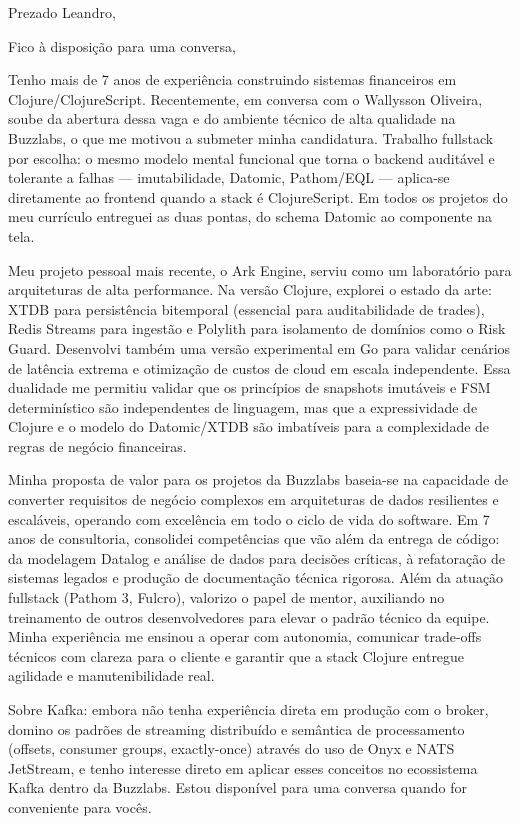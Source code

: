 \documentclass[10pt,a4paper,sans]{moderncv}
\begin{document}
\makecvtitle

\vspace{-1em}
\date{\today}
\opening{Prezado Leandro,}
\closing{Fico à disposição para uma conversa,}
\makelettertitle

Tenho mais de 7 anos de experiência construindo sistemas financeiros em Clojure/ClojureScript. Recentemente, em conversa com o Wallysson Oliveira, soube da abertura dessa vaga e do ambiente técnico de alta qualidade na Buzzlabs, o que me motivou a submeter minha candidatura. Trabalho fullstack por escolha: o mesmo modelo mental funcional que torna o backend auditável e tolerante a falhas --- imutabilidade, Datomic, Pathom/EQL --- aplica-se diretamente ao frontend quando a stack é ClojureScript. Em todos os projetos do meu currículo entreguei as duas pontas, do schema Datomic ao componente na tela.

Meu projeto pessoal mais recente, o Ark Engine, serviu como um laboratório para arquiteturas de alta performance. Na versão Clojure, explorei o estado da arte: XTDB para persistência bitemporal (essencial para auditabilidade de trades), Redis Streams para ingestão e Polylith para isolamento de domínios como o Risk Guard. Desenvolvi também uma versão experimental em Go para validar cenários de latência extrema e otimização de custos de cloud em escala independente. Essa dualidade me permitiu validar que os princípios de snapshots imutáveis e FSM determinístico são independentes de linguagem, mas que a expressividade de Clojure e o modelo do Datomic/XTDB são imbatíveis para a complexidade de regras de negócio financeiras.

Minha proposta de valor para os projetos da Buzzlabs baseia-se na capacidade de converter requisitos de negócio complexos em arquiteturas de dados resilientes e escaláveis, operando com excelência em todo o ciclo de vida do software. Em 7 anos de consultoria, consolidei competências que vão além da entrega de código: da modelagem Datalog e análise de dados para decisões críticas, à refatoração de sistemas legados e produção de documentação técnica rigorosa. Além da atuação fullstack (Pathom 3, Fulcro), valorizo o papel de mentor, auxiliando no treinamento de outros desenvolvedores para elevar o padrão técnico da equipe. Minha experiência me ensinou a operar com autonomia, comunicar trade-offs técnicos com clareza para o cliente e garantir que a stack Clojure entregue agilidade e manutenibilidade real.

Sobre Kafka: embora não tenha experiência direta em produção com o broker, domino os padrões de streaming distribuído e semântica de processamento (offsets, consumer groups, exactly-once) através do uso de Onyx e NATS JetStream, e tenho interesse direto em aplicar esses conceitos no ecossistema Kafka dentro da Buzzlabs. Estou disponível para uma conversa quando for conveniente para vocês.

\makeletterclosing
\end{document}
